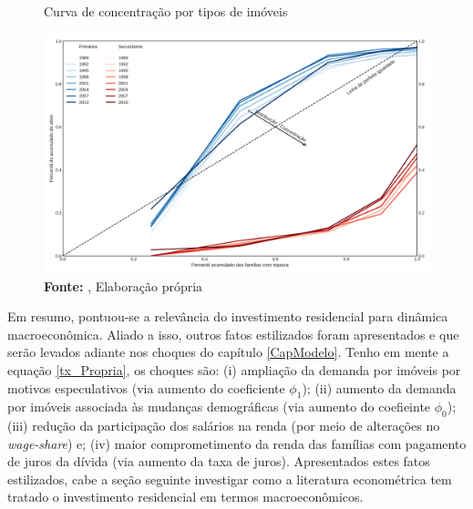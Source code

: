 \begin{figure}[H]
	\centering
	\caption{Curva de concentração por tipos de imóveis}
	\label{FigConcentracao}
	\includegraphics[width=\textwidth]{../../Dados/Fatos_Estilizados/figs/Concentracao_Imoveis.png}
	\caption*{\textbf{Fonte:} \textcite{us_census_bureau_characteristics_2017}, Elaboração própria}
\end{figure}

Em resumo, pontuou-se a relevância do investimento residencial para dinâmica macroeconômica.
Aliado a isso, outros fatos estilizados foram apresentados e que serão levados adiante nos choques do capítulo \ref{CapModelo}.
Tenho em mente a equação \ref{tx_Propria}, os choques são:
	(i) ampliação da demanda por imóveis por motivos especulativos (via aumento do coeficiente $\phi_1$);
	(ii) aumento da demanda por imóveis associada às mudanças demográficas (via aumento do coefieinte $\phi_0$);
	(iii) redução da participação dos salários na renda (por meio de alterações no \textit{wage-share})
	e;  
	(iv) maior comprometimento da renda das famílias com pagamento de juros da dívida (via aumento da taxa de juros).
Apresentados estes fatos estilizados, cabe a seção seguinte investigar como a literatura econométrica tem tratado o investimento residencial em termos macroeconômicos.

